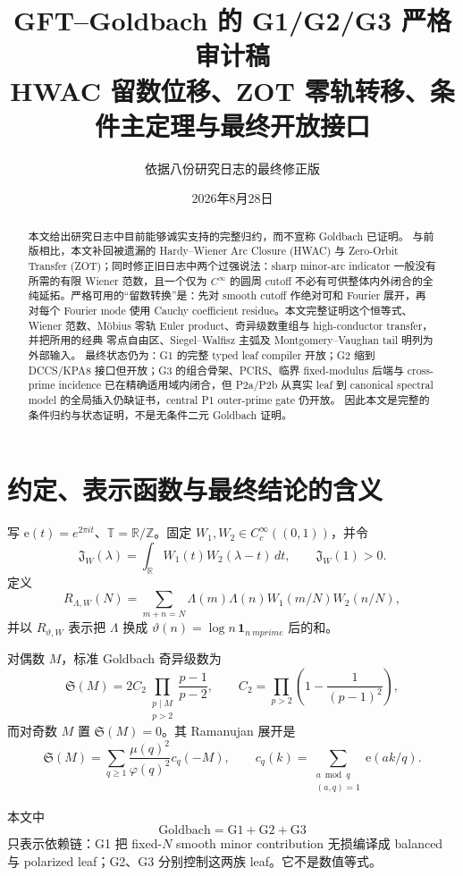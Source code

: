 \documentclass[11pt,a4paper]{ctexart}
\title{GFT--Goldbach 的 G1/G2/G3 严格审计稿\\
\large HWAC 留数位移、ZOT 零轨转移、条件主定理与最终开放接口}
\author{依据八份研究日志的最终修正版}
\date{2026年8月28日}
\theoremstyle{definition}
\newcommand{\T}{\mathbb T}
\newcommand{\e}{\mathrm e}
\newcommand{\1}{\mathbf 1}
\begin{document}
\maketitle

\begin{abstract}
\sloppy
本文给出研究日志中目前能够诚实支持的完整归约，而不宣称 Goldbach 已证明。
与前版相比，本文补回被遗漏的 Hardy--Wiener Arc Closure (HWAC) 与
Zero-Orbit Transfer (ZOT)；同时修正旧日志中两个过强说法：sharp minor-arc
indicator 一般没有所需的有限 Wiener 范数，且一个仅为 $C^\infty$ 的圆周
cutoff 不必有可供整体内外闭合的全纯延拓。严格可用的“留数转换”是：先对
smooth cutoff 作绝对可和 Fourier 展开，再对每个 Fourier mode 使用 Cauchy
coefficient residue。本文完整证明这个恒等式、Wiener 范数、Möbius 零轨
Euler product、奇异级数重组与 high-conductor transfer，并把所用的经典
零点自由区、Siegel--Walfisz 主弧及 Montgomery--Vaughan tail 明列为外部输入。
最终状态仍为：G1 的完整 typed leaf compiler 开放；G2 缩到 DCCS/KPA8
接口但开放；G3 的组合骨架、PCRS、临界 fixed-modulus 后端与 cross-prime
incidence 已在精确适用域内闭合，但 P2a/P2b 从真实 leaf 到 canonical spectral
model 的全局插入仍缺证书，central P1 outer-prime gate 仍开放。
因此本文是完整的条件归约与状态证明，不是无条件二元 Goldbach 证明。
\end{abstract}

\section{约定、表示函数与最终结论的含义}

写 $\e(t)=e^{2\pi i t}$、$\T=\mathbb R/\mathbb Z$。固定
$W_1,W_2\in C_c^\infty((0,1))$，并令
\[
\mathfrak J_W(\lambda)=\int_{\mathbb R}W_1(t)W_2(\lambda-t)\,dt,
\qquad \mathfrak J_W(1)>0.
\tag{1.1}
\]
定义
\[
R_{\Lambda,W}(N)=\sum_{m+n=N}\Lambda(m)\Lambda(n)
 W_1(m/N)W_2(n/N),                                      \tag{1.2}
\]
并以 $R_{\vartheta,W}$ 表示把 $\Lambda$ 换成
$\vartheta(n)=\log n\,\1_{n\ {
m prime}}$ 后的和。

对偶数 $M$，标准 Goldbach 奇异级数为
\[
\mathfrak S(M)=2C_2\prod_{\substack{p\mid M\\p>2}}\frac{p-1}{p-2},
\qquad
C_2=\prod_{p>2}\left(1-\frac1{(p-1)^2}\right),          \tag{1.3}
\]
而对奇数 $M$ 置 $\mathfrak S(M)=0$。其 Ramanujan 展开是
\[
\mathfrak S(M)=\sum_{q\ge1}\frac{\mu(q)^2}{\varphi(q)^2}c_q(-M),
\qquad
c_q(k)=\sum_{\substack{a\bmod q\\(a,q)=1}}\e(ak/q).   \tag{1.4}
\]

本文中
\[
\boxed{\text{Goldbach}=\mathrm{G1}+\mathrm{G2}+\mathrm{G3}}
\]
只表示依赖链：G1 把 fixed-$N$ smooth minor contribution 无损编译成
balanced 与 polarized leaf；G2、G3 分别控制这两族 leaf。它不是数值等式。
\end{document}
